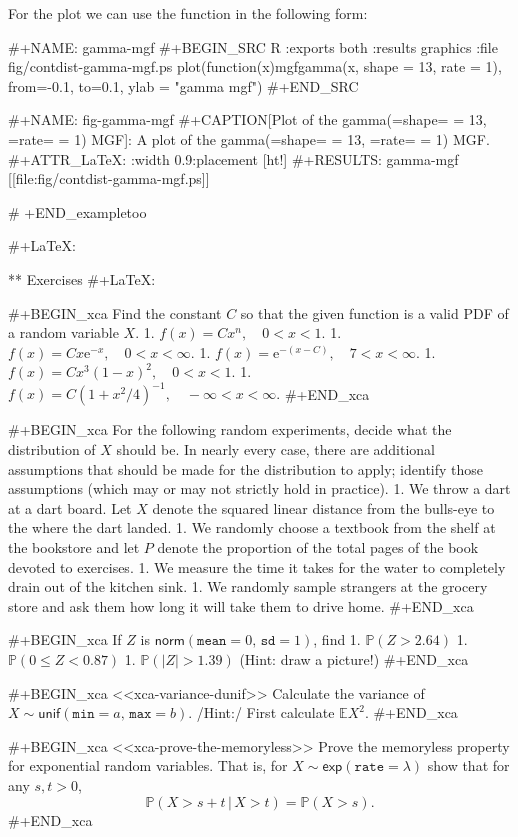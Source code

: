 For the plot we can use the function in the following form:

#+NAME: gamma-mgf
#+BEGIN_SRC R :exports both :results graphics :file fig/contdist-gamma-mgf.ps
plot(function(x){mgfgamma(x, shape = 13, rate = 1)}, 
     from=-0.1, to=0.1, ylab = "gamma mgf")
#+END_SRC

#+NAME: fig-gamma-mgf
#+CAPTION[Plot of the \textsf{gamma}(=shape= = 13, =rate= = 1) MGF]: \small A plot of the \textsf{gamma}(=shape= = 13, =rate= = 1) MGF.
#+ATTR_LaTeX: :width 0.9\textwidth :placement [ht!]
#+RESULTS: gamma-mgf
[[file:fig/contdist-gamma-mgf.ps]]

# +END_exampletoo


#+LaTeX: \newpage{}

** Exercises
#+LaTeX: \setcounter{thm}{0}

#+BEGIN_xca
Find the constant \(C\) so that the given function is a valid PDF of a random variable \(X\).
1. \( f(x) = Cx^{n},\quad 0 < x <1 \).
1. \( f(x) = Cx\mathrm{e}^{-x},\quad 0 < x < \infty\).
1. \( f(x) = \mathrm{e}^{-(x - C)}, \quad 7 < x < \infty.\)
1. \( f(x) = Cx^{3}(1 - x)^{2},\quad 0 < x < 1.\)
1. \( f(x) = C(1 + x^{2}/4)^{-1}, \quad -\infty < x < \infty.\)
#+END_xca

#+BEGIN_xca
For the following random experiments, decide what the distribution of
\(X\) should be. In nearly every case, there are additional
assumptions that should be made for the distribution to apply;
identify those assumptions (which may or may not strictly hold in
practice).
1. We throw a dart at a dart board. Let \(X\) denote the squared
   linear distance from the bulls-eye to the where the dart landed.
1. We randomly choose a textbook from the shelf at the bookstore and
   let \(P\) denote the proportion of the total pages of the book
   devoted to exercises.
1. We measure the time it takes for the water to completely drain out
   of the kitchen sink.
1. We randomly sample strangers at the grocery store and ask them how
   long it will take them to drive home.
#+END_xca

#+BEGIN_xca
If \(Z\) is \(\mathsf{norm}(\mathtt{mean} = 0,\,\mathtt{sd} = 1)\), find 
1. \(\mathbb{P}(Z > 2.64)\)
1. \(\mathbb{P}(0 \leq Z < 0.87)\)
1. \(\mathbb{P}(|Z| > 1.39)\) (Hint: draw a picture!)
#+END_xca

#+BEGIN_xca
<<xca-variance-dunif>> Calculate the variance of
\(X\sim\mathsf{unif}(\mathtt{min}=a,\,\mathtt{max}=b)\). /Hint:/ First
calculate \(\mathbb{E} X^{2}\).
#+END_xca

#+BEGIN_xca
<<xca-prove-the-memoryless>> Prove the memoryless property for
exponential random variables. That is, for \(X \sim
\mathsf{exp}(\mathtt{rate} = \lambda)\) show that for any \(s,t > 0\),
\[ \mathbb{P}(X > s + t\,|\, X > t) = \mathbb{P}(X > s).  \]
#+END_xca
